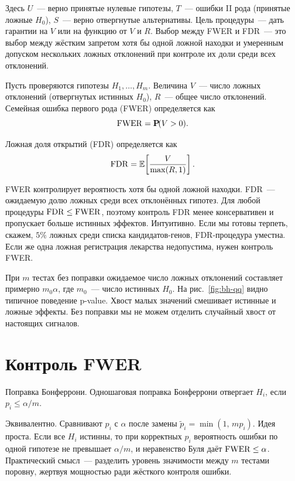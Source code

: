Здесь $U$~--- верно принятые нулевые гипотезы, $T$~--- ошибки II рода (принятые ложные $H_0$), $S$~--- верно отвергнутые альтернативы.
Цель процедуры~--- дать гарантии на $V$ или на функцию от $V$ и $R$.
Выбор между FWER и FDR~--- это выбор между жёстким запретом хотя бы одной ложной находки и умеренным допуском нескольких ложных отклонений при контроле их доли среди всех отклонений.

\begin{definition}
Пусть проверяются гипотезы $H_1,\ldots,H_m$. Величина $V$~--- число ложных отклонений (отвергнутых истинных $H_0$), $R$~--- общее число отклонений.
Семейная ошибка первого рода (FWER) определяется как
\[ \operatorname{FWER} = \operatorname{\mathbf{P}\!}(V>0).
\]
\end{definition}

\begin{definition}
Ложная доля открытий (FDR) определяется как
\[ \operatorname{FDR} = \mathbb E\!\left[\frac{V}{\max(R,1)}\right].
\]
\end{definition}

FWER контролирует вероятность хотя бы одной ложной находки. FDR~--- ожидаемую долю ложных среди всех отклонённых гипотез.
Для любой процедуры $\operatorname{FDR}\leq\operatorname{FWER}$, поэтому контроль FDR менее консервативен и пропускает больше истинных эффектов.
Интуитивно. Если мы готовы терпеть, скажем, $5\%$ ложных среди списка кандидатов-генов, FDR-процедура уместна. Если же одна ложная регистрация лекарства недопустима, нужен контроль FWER.

\begin{remark}
При $m$ тестах без поправки ожидаемое число ложных отклонений составляет примерно $m_0\alpha$, где $m_0$~--- число истинных $H_0$.
На рис.~\ref{fig:bh-qq} видно типичное поведение p-value. Хвост малых значений смешивает истинные и ложные эффекты.
Без поправки мы не можем отделить случайный хвост от настоящих сигналов.
\end{remark}

\section{Контроль FWER}

Поправка Бонферрони. Одношаговая поправка Бонферрони отвергает $H_i$, если $p_i\leq \alpha/m$.

Эквивалентно. Сравнивают $p_i$ с $\alpha$ после замены $\tilde p_i=\min(1,\,m p_i)$.
Идея проста. Если все $H_i$ истинны, то при корректных $p_i$ вероятность ошибки по одной гипотезе не превышает $\alpha/m$, и неравенство Буля даёт $\operatorname{FWER}\leq\alpha$.
Практический смысл~--- разделить уровень значимости между $m$ тестами поровну, жертвуя мощностью ради жёсткого контроля ошибки.

